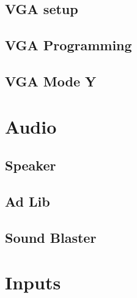 \documentclass[book.tex]{subfiles}
\begin{document}
  \subsection{VGA setup}

  \subsection{VGA Programming}
  \subsection{VGA Mode Y}
\section{Audio}
  \subsection{Speaker}
  \subsection{Ad Lib}
  \subsection{Sound Blaster}

\section{Inputs}
\end{document}

